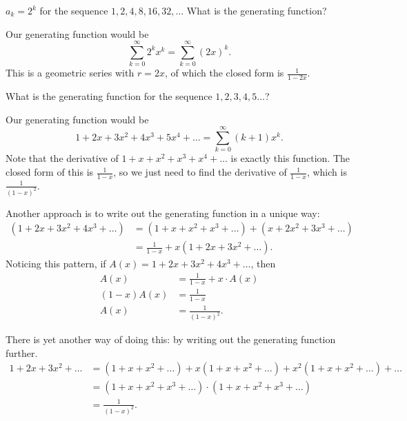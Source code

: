
\begin{eg}
	\( a_k=2^k \) for the sequence \( 1,2,4,8,16,32,\ldots  \) What is the generating function?
\end{eg}

Our generating function would be \[ \sum_{k=0}^{\infty} 2^{k}x^{k} = \sum_{k=0}^{\infty} (2x)^k.\] This is a geometric series with \( r = 2x \), of which the closed form is \( \frac{1}{1-2x} \).

\begin{eg}
	What is the generating function for the sequence \( 1,2,3,4,5\ldots  \)?
\end{eg}

Our generating function would be \[
	1+2x+3x^2+4x^3+5x^4+\ldots = \sum_{k=0}^{\infty}(k+1)x^{k}
.\] Note that the derivative of \( 1+x+x^2+x^3+x^4+\ldots  \) is exactly this function. The closed form of this is \( \frac{1}{1-x} \), so we just need to find the derivative of \( \frac{1}{1-x} \), which is \( \frac{1}{(1-x)^2} \).

Another approach is to write out the generating function in a unique way:
\begin{align*}
	(1 + 2x + 3x^2 + 4x^3 + \ldots) &= (1 + x + x^2 + x^3 + \ldots) + (x + 2x^2 + 3x^3 + \ldots) \\
																	&= \frac{1}{1-x} + x\left( 1 + 2x + 3x^2 + \ldots \right)
.\end{align*}
Noticing this pattern, if \( A(x) = 1 + 2x + 3x^2 + 4x^3 + \ldots  \), then 
\begin{align*}
	A(x) &= \frac{1}{1-x} + x\cdot A(x) \\
	(1-x)A(x) &= \frac{1}{1-x} \\
	A(x) &= \frac{1}{(1-x)^2}
.\end{align*}

There is yet another way of doing this: by writing out the generating function further.
\begin{align*}
	1+2x+3x^2+\ldots &= (1+x+x^2+\ldots ) + x(1+x+x^2+\ldots  ) + x^2(1+x+x^2+\ldots  ) + \ldots  \\
												&= (1+x+x^2+x^3+\ldots )\cdot (1+x+x^2+x^3+\ldots ) \\
												&= \frac{1}{(1-x)^2}
.\end{align*}


